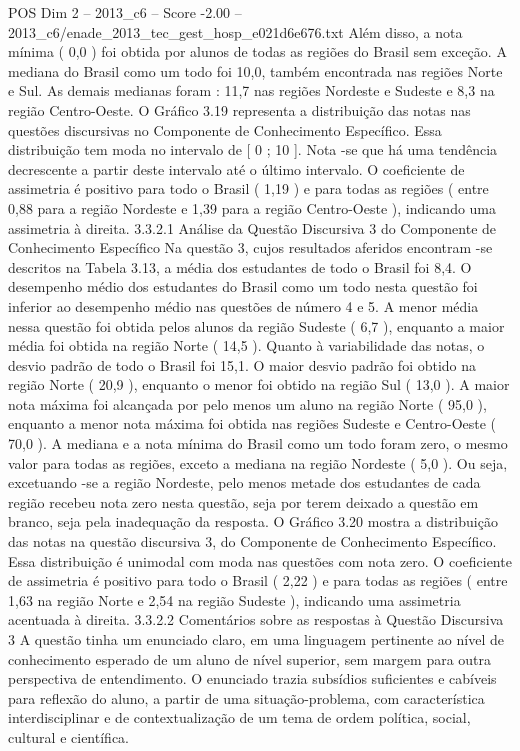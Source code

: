 \begin{textsample}{POS Dim 2 – 2013\_c6 – Score -2.00 – 2013\_c6/enade\_2013\_tec\_gest\_hosp\_e021d6e676.txt}
Além disso, a nota mínima ( 0,0 ) foi obtida por alunos de todas as regiões do Brasil sem exceção.
A mediana do Brasil como um todo foi 10,0, também encontrada nas regiões Norte e Sul.
As demais medianas foram : 11,7 nas regiões Nordeste e Sudeste e 8,3 na região Centro-Oeste.
O Gráfico 3.19 representa a distribuição das notas nas questões discursivas no Componente de Conhecimento Específico.
Essa distribuição tem moda no intervalo de [ 0 ; 10 ].
Nota -se que há uma tendência decrescente a partir deste intervalo até o último intervalo.
O coeficiente de assimetria é positivo para todo o Brasil ( 1,19 ) e para todas as regiões ( entre 0,88 para a região Nordeste e 1,39 para a região Centro-Oeste ), indicando uma assimetria à direita. 3.3.2.1 Análise da Questão Discursiva 3 do Componente de Conhecimento Específico Na questão 3, cujos resultados aferidos encontram -se descritos na Tabela 3.13, a média dos estudantes de todo o Brasil foi 8,4.
O desempenho médio dos estudantes do Brasil como um todo nesta questão foi inferior ao desempenho médio nas questões de número 4 e 5.
A menor média nessa questão foi obtida pelos alunos da região Sudeste ( 6,7 ), enquanto a maior média foi obtida na região Norte ( 14,5 ).
Quanto à variabilidade das notas, o desvio padrão de todo o Brasil foi 15,1.
O maior desvio padrão foi obtido na região Norte ( 20,9 ), enquanto o menor foi obtido na região Sul ( 13,0 ).
A maior nota máxima foi alcançada por pelo menos um aluno na região Norte ( 95,0 ), enquanto a menor nota máxima foi obtida nas regiões Sudeste e Centro-Oeste ( 70,0 ).
A mediana e a nota mínima do Brasil como um todo foram zero, o mesmo valor para todas as regiões, exceto a mediana na região Nordeste ( 5,0 ).
Ou seja, excetuando -se a região Nordeste, pelo menos metade dos estudantes de cada região recebeu nota zero nesta questão, seja por terem deixado a questão em branco, seja pela inadequação da resposta.
O Gráfico 3.20 mostra a distribuição das notas na questão discursiva 3, do Componente de Conhecimento Específico.
Essa distribuição é unimodal com moda nas questões com nota zero.
O coeficiente de assimetria é positivo para todo o Brasil ( 2,22 ) e para todas as regiões ( entre 1,63 na região Norte e 2,54 na região Sudeste ), indicando uma assimetria acentuada à direita. 3.3.2.2 Comentários sobre as respostas à Questão Discursiva 3 A questão tinha um enunciado claro, em uma linguagem pertinente ao nível de conhecimento esperado de um aluno de nível superior, sem margem para outra perspectiva de entendimento.
O enunciado trazia subsídios suficientes e cabíveis para reflexão do aluno, a partir de uma situação-problema, com característica interdisciplinar e de contextualização de um tema de ordem política, social, cultural e científica.

\end{textsample}
